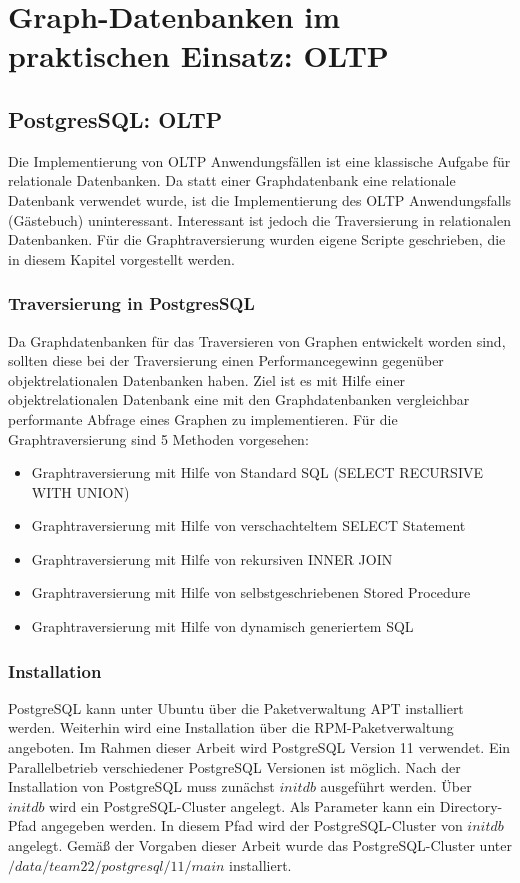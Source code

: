 \chapter{Graph-Datenbanken im praktischen Einsatz: \ac{OLTP}}
\section{PostgresSQL: OLTP}
Die Implementierung von OLTP Anwendungsfällen ist eine klassische Aufgabe für relationale Datenbanken.
Da statt einer Graphdatenbank eine relationale Datenbank verwendet wurde, ist die Implementierung des OLTP Anwendungsfalls (Gästebuch) uninteressant.
Interessant ist jedoch die Traversierung in relationalen Datenbanken.
Für die Graphtraversierung wurden eigene Scripte geschrieben, die in diesem Kapitel vorgestellt werden.
\subsection{Traversierung in PostgresSQL}
Da Graphdatenbanken für das Traversieren von Graphen entwickelt worden sind, sollten diese bei der Traversierung einen Performancegewinn gegenüber objektrelationalen Datenbanken haben.
Ziel ist es mit Hilfe einer objektrelationalen Datenbank eine mit den Graphdatenbanken vergleichbar performante Abfrage eines Graphen zu implementieren.
Für die Graphtraversierung sind 5 Methoden vorgesehen:
\begin{itemize}
    \item Graphtraversierung mit Hilfe von Standard \ac{SQL} (SELECT RECURSIVE WITH UNION)
    \item Graphtraversierung mit Hilfe von verschachteltem SELECT Statement
    \item Graphtraversierung mit Hilfe von rekursiven INNER JOIN
    \item Graphtraversierung mit Hilfe von selbstgeschriebenen Stored Procedure
    \item Graphtraversierung mit Hilfe von dynamisch generiertem \ac{SQL}
\end{itemize}
\subsection{Installation}
PostgreSQL kann unter Ubuntu über die Paketverwaltung \ac{APT} installiert werden. Weiterhin wird eine Installation über die \ac{RPM}-Paketverwaltung angeboten. Im Rahmen dieser
Arbeit wird PostgreSQL Version 11 verwendet. Ein Parallelbetrieb verschiedener PostgreSQL Versionen ist möglich. Nach der Installation von PostgreSQL muss zunächst
$initdb$ ausgeführt werden. Über $initdb$ wird ein PostgreSQL-Cluster angelegt. Als Parameter kann ein Directory-Pfad angegeben werden.
In diesem Pfad wird der PostgreSQL-Cluster von $initdb$ angelegt. Gemäß der Vorgaben dieser Arbeit wurde das PostgreSQL-Cluster unter
$/data/team22/postgresql/11/main$ installiert.
